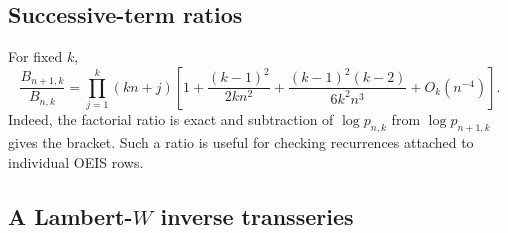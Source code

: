 \documentclass[11pt,letterpaper]{article}
\theoremstyle{definition}
\theoremstyle{remark}
\begin{document}
\subsection{Successive-term ratios}

For fixed $k$,
\begin{equation}\label{bsw:eq:ratio}
 \frac{B_{n+1,k}}{B_{n,k}}
 =\prod_{j=1}^k(kn+j)
 \left[1+\frac{(k-1)^2}{2kn^2}
 +\frac{(k-1)^2(k-2)}{6k^2n^3}
 +O_k(n^{-4})\right].
\end{equation}
Indeed, the factorial ratio is exact and subtraction of
$\log p_{n,k}$ from $\log p_{n+1,k}$ gives the bracket.  Such a ratio is
useful for checking recurrences attached to individual OEIS rows.

\subsection{A Lambert-\texorpdfstring{$W$}{W} inverse transseries}
\end{document}
